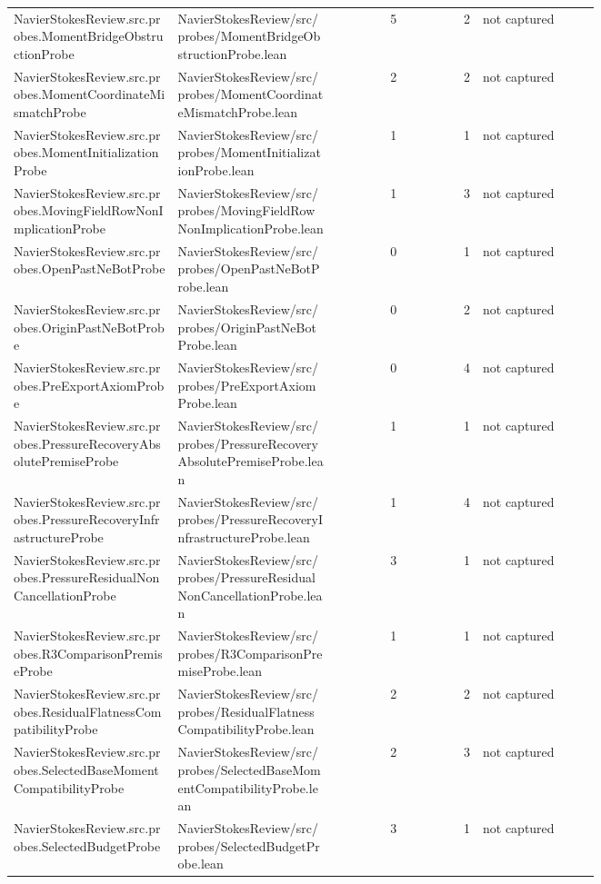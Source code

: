 \documentclass[10pt]{article}
\begin{document}
\begin{longtable}{p{0.28\linewidth}p{0.27\linewidth}r r p{0.20\linewidth}}
NavierStokesReview.src.probes.MomentBridgeObstructionProbe & NavierStokesReview/src/probes/MomentBridgeObstructionProbe.lean & 5 & 2 & not captured\\
NavierStokesReview.src.probes.MomentCoordinateMismatchProbe & NavierStokesReview/src/probes/MomentCoordinateMismatchProbe.lean & 2 & 2 & not captured\\
NavierStokesReview.src.probes.MomentInitializationProbe & NavierStokesReview/src/probes/MomentInitializationProbe.lean & 1 & 1 & not captured\\
NavierStokesReview.src.probes.MovingFieldRowNonImplicationProbe & NavierStokesReview/src/probes/MovingFieldRowNonImplicationProbe.lean & 1 & 3 & not captured\\
NavierStokesReview.src.probes.OpenPastNeBotProbe & NavierStokesReview/src/probes/OpenPastNeBotProbe.lean & 0 & 1 & not captured\\
NavierStokesReview.src.probes.OriginPastNeBotProbe & NavierStokesReview/src/probes/OriginPastNeBotProbe.lean & 0 & 2 & not captured\\
NavierStokesReview.src.probes.PreExportAxiomProbe & NavierStokesReview/src/probes/PreExportAxiomProbe.lean & 0 & 4 & not captured\\
NavierStokesReview.src.probes.PressureRecoveryAbsolutePremiseProbe & NavierStokesReview/src/probes/PressureRecoveryAbsolutePremiseProbe.lean & 1 & 1 & not captured\\
NavierStokesReview.src.probes.PressureRecoveryInfrastructureProbe & NavierStokesReview/src/probes/PressureRecoveryInfrastructureProbe.lean & 1 & 4 & not captured\\
NavierStokesReview.src.probes.PressureResidualNonCancellationProbe & NavierStokesReview/src/probes/PressureResidualNonCancellationProbe.lean & 3 & 1 & not captured\\
NavierStokesReview.src.probes.R3ComparisonPremiseProbe & NavierStokesReview/src/probes/R3ComparisonPremiseProbe.lean & 1 & 1 & not captured\\
NavierStokesReview.src.probes.ResidualFlatnessCompatibilityProbe & NavierStokesReview/src/probes/ResidualFlatnessCompatibilityProbe.lean & 2 & 2 & not captured\\
NavierStokesReview.src.probes.SelectedBaseMomentCompatibilityProbe & NavierStokesReview/src/probes/SelectedBaseMomentCompatibilityProbe.lean & 2 & 3 & not captured\\
NavierStokesReview.src.probes.SelectedBudgetProbe & NavierStokesReview/src/probes/SelectedBudgetProbe.lean & 3 & 1 & not captured\\

\end{longtable}
\end{document}

